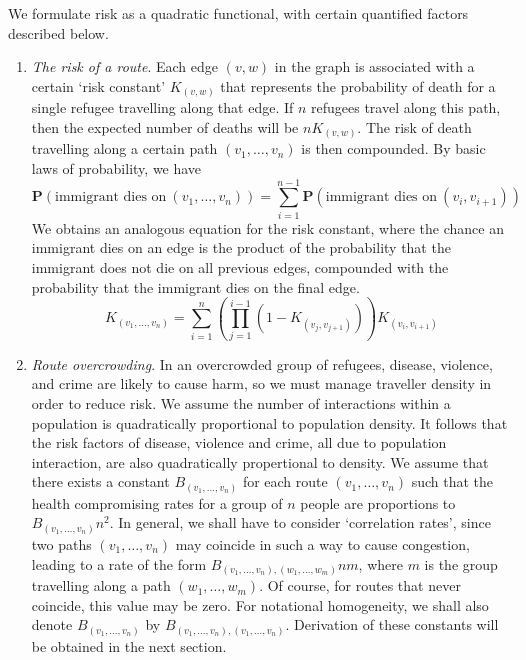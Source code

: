 \documentclass{article}
\begin{document}
We formulate risk as a quadratic functional, with certain quantified factors described below.

\begin{enumerate}
    \item {\it The risk of a route}. Each edge $(v,w)$ in the graph is associated with a certain `risk constant' $K_{(v,w)}$ that represents the probability of death for a single refugee travelling along that edge. If $n$ refugees travel along this path, then the expected number of deaths will be $n K_{(v,w)}$. The risk of death travelling along a certain path $(v_1, \dots, v_n)$ is then compounded. By basic laws of probability, we have
    \[ \mathbf{P}(\text{immigrant dies on}\ (v_1, \dots, v_n)) = \sum_{i = 1}^{n-1} \mathbf{P}(\text{immigrant dies on}\ (v_i, v_{i+1})) \]
    We obtains an analogous equation for the risk constant, where the chance an immigrant dies on an edge is the product of the probability that the immigrant does not die on all previous edges, compounded with the probability that the immigrant dies on the final edge.
    \[ K_{(v_1, \dots, v_n)} = \sum_{i = 1}^n \left( \prod_{j = 1}^{i-1} \left(1 - K_{(v_j,v_{j+1})} \right) \right) K_{(v_i, v_{i+1})} \]

    \item {\it Route overcrowding}. In an overcrowded group of refugees, disease, violence, and crime are likely to cause harm, so we must manage traveller density in order to reduce risk. We assume the number of interactions within a population is quadratically proportional to population density. It follows that the risk factors of disease, violence and crime, all due to population interaction, are also quadratically propertional to density. We assume that there exists a constant $B_{(v_1, \dots, v_n)}$ for each route $(v_1, \dots, v_n)$ such that the health compromising rates for a group of $n$ people are proportions to $B_{(v_1, \dots, v_n)} n^2$. In general, we shall have to consider `correlation rates', since two paths $(v_1, \dots, v_n)$ may coincide in such a way to cause congestion, leading to a rate of the form $B_{(v_1, \dots, v_n), (w_1, \dots, w_m)} n m$, where $m$ is the group travelling along a path $(w_1, \dots, w_m)$. Of course, for routes that never coincide, this value may be zero. For notational homogeneity, we shall also denote $B_{(v_1, \dots, v_n)}$ by $B_{(v_1, \dots, v_n), (v_1, \dots, v_n)}$. Derivation of these constants will be obtained in the next section.
\end{enumerate}
\end{document}
